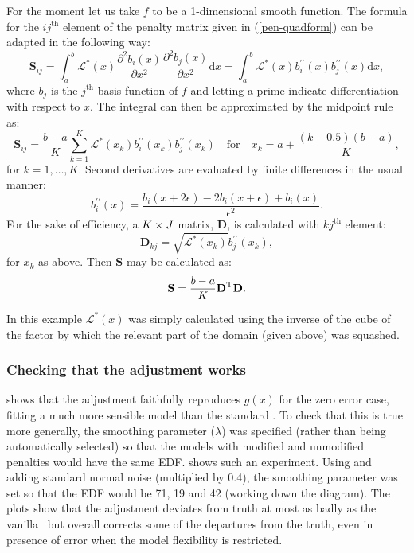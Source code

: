 For the moment let us take $f$ to be a 1-dimensional smooth function. The formula for the $ij^\text{th}$ element of the penalty matrix given in (\ref{pen-quadform}) can be adapted in the following way: 
\begin{equation*}
\mathbf{S}_{ij}= \int_a^b \mathcal{L}^*(x) \frac{\partial^2 b_i(x)}{\partial x^2}\frac{\partial^2 b_j(x)}{\partial x^2} \text{d}x = \int_a^b \mathcal{L}^*(x) b^{\prime\prime}_i(x) b^{\prime\prime}_j(x) \text{d}x,
\end{equation*}
where $b_j$ is the $j^\text{th}$ basis function of $f$ and letting a prime indicate differentiation with respect to $x$. The integral can then be approximated by the midpoint rule as:
\begin{equation}
\mathbf{S}_{ij}= \frac{b-a}{K}\sum_{k=1}^K \mathcal{L}^*(x_k) b^{\prime\prime}_i(x_k) b^{\prime\prime}_j(x_k) \quad \text{for} \quad x_k=a+\frac{(k-0.5)(b-a)}{K},
\label{midpointS}
\end{equation}
for $k=1,\dots, K$. Second derivatives are evaluated by finite differences in the usual manner:
\begin{equation}
\label{bfinitediff}
b^{\prime\prime}_i(x) = \frac{ b_i(x+2\epsilon) - 2b_i(x+\epsilon) + b_i(x)}{\epsilon^2}.
\end{equation}
For the sake of efficiency, a $K\times J$ matrix, $\mathbf{D}$, is calculated with $kj^\text{th}$ element:
\begin{equation}
\mathbf{D}_{kj}=\sqrt{\mathcal{L}^*(x_k)} b^{\prime\prime}_j(x_k),
\label{oneDD}
\end{equation}
for $x_k$ as above. Then $\mathbf{S}$ may be calculated as:
\begin{equation*}
\mathbf{S}=\frac{b-a}{K}\mathbf{D}^{\text{T}}\mathbf{D}.
\end{equation*}

In this example $\mathcal{L}^*(x)$ was simply calculated using the inverse of the cube of the factor by which the relevant part of the domain (given above) was squashed. 

\subsubsection{Checking that the adjustment works}

 shows that the adjustment faithfully reproduces $g(x)$ for the zero error case, fitting a much more sensible model than the standard \tprs. To check that this is true more generally, the smoothing parameter ($\lambda$) was specified (rather than being automatically selected) so that the models with modified and unmodified penalties would have the same EDF.  shows such an experiment. Using  and adding standard normal noise (multiplied by 0.4), the smoothing parameter was set so that the EDF would be 71, 19 and 42 (working down the diagram). The plots show that the adjustment deviates from truth at most as badly as the vanilla \tprs\ but overall corrects some of the departures from the truth, even in presence of error when the model flexibility is restricted.

